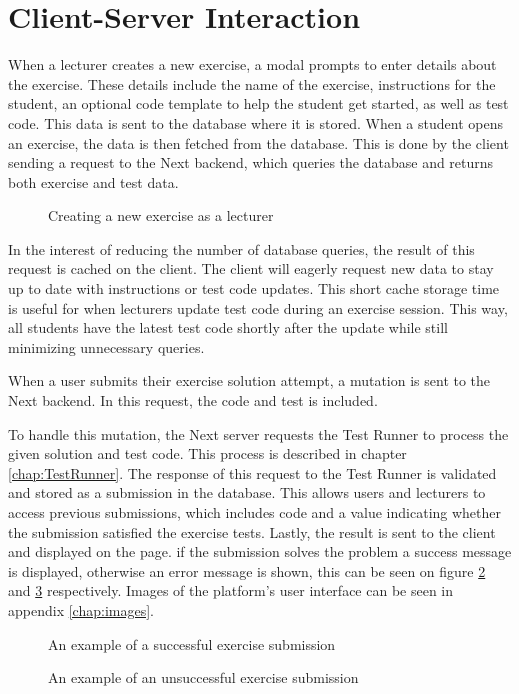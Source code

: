 \section{Client-Server Interaction}
When a lecturer creates a new exercise, a modal prompts to enter details about the exercise.
These details include the name of the exercise, instructions for the student, an optional code template to help the student get started, as well as test code.
This data is sent to the database where it is stored.
When a student opens an exercise, the data is then fetched from the database.
This is done by the client sending a request to the Next backend, which queries the database and returns both exercise and test data.

\begin{figure}[H]
    \centering
    \caption{Creating a new exercise as a lecturer}
    \label{fig:create_exercise}
\end{figure}

In the interest of reducing the number of database queries, the result of this request is cached on the client.
The client will eagerly request new data to stay up to date with instructions or test code updates.
This short cache storage time is useful for when lecturers update test code during an exercise session.
This way, all students have the latest test code shortly after the update while still minimizing unnecessary queries.

When a user submits their exercise solution attempt, a mutation is sent to the Next backend.
In this request, the code and test is included.

To handle this mutation, the Next server requests the Test Runner to process the given solution and test code.
This process is described in chapter \ref{chap:TestRunner}.
The response of this request to the Test Runner is validated and stored as a submission in the database.
This allows users and lecturers to access previous submissions, which includes code and a value indicating whether the submission satisfied the exercise tests.
Lastly, the result is sent to the client and displayed on the page.
if the submission solves the problem a success message is displayed, otherwise an error message is shown, this can be seen on figure \ref{fig:exercise_success} and \ref{fig:exercise_fail} respectively.
Images of the platform's user interface can be seen in appendix \ref{chap:images}.

\begin{figure}[H]
	\centering
	\caption{An example of a successful exercise submission}
	\label{fig:exercise_success}
\end{figure}

\begin{figure}[H]
	\centering
	\caption{An example of an unsuccessful exercise submission}
	\label{fig:exercise_fail}
\end{figure}
